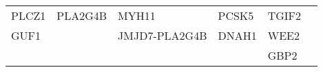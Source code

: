 \documentclass[12pt,twoside]{reedthesis}
\theoremstyle{definition}
\theoremstyle{definition}
\theoremstyle{remark}
\begin{document}
\begin{longtable}[]{@{}llllll@{}}
\begin{minipage}[t]{0.07\columnwidth}
  PLCZ1\strut
  \end{minipage} & \begin{minipage}[t]{0.16\columnwidth}\raggedright\strut
  PLA2G4B\strut
  \end{minipage} & \begin{minipage}[t]{0.09\columnwidth}\raggedright\strut
  MYH11\strut
  \end{minipage} & \begin{minipage}[t]{0.09\columnwidth}\raggedright\strut
  PCSK5\strut
  \end{minipage} & \begin{minipage}[t]{0.09\columnwidth}\raggedright\strut
  TGIF2\strut
  \end{minipage}\tabularnewline
  \begin{minipage}[t]{0.08\columnwidth}\raggedright\strut
  GUF1\strut
  \end{minipage} & \begin{minipage}[t]{0.07\columnwidth}\raggedright\strut
  \strut
  \end{minipage} & \begin{minipage}[t]{0.16\columnwidth}\raggedright\strut
  JMJD7-PLA2G4B\strut
  \end{minipage} & \begin{minipage}[t]{0.09\columnwidth}\raggedright\strut
  DNAH1\strut
  \end{minipage} & \begin{minipage}[t]{0.09\columnwidth}\raggedright\strut
  WEE2\strut
  \end{minipage} & \begin{minipage}[t]{0.09\columnwidth}\raggedright\strut
  \strut
  \end{minipage}\tabularnewline
  \begin{minipage}[t]{0.08\columnwidth}\raggedright\strut
  \strut
  \end{minipage} & \begin{minipage}[t]{0.07\columnwidth}\raggedright\strut
  \strut
  \end{minipage} & \begin{minipage}[t]{0.16\columnwidth}\raggedright\strut
  \strut
  \end{minipage} & \begin{minipage}[t]{0.09\columnwidth}\raggedright\strut
  \strut
  \end{minipage} & \begin{minipage}[t]{0.09\columnwidth}\raggedright\strut
  GBP2\strut
  \end{minipage} & \begin{minipage}[t]{0.09\columnwidth}\raggedright\strut

\end{minipage}
\end{longtable}
\end{document}
